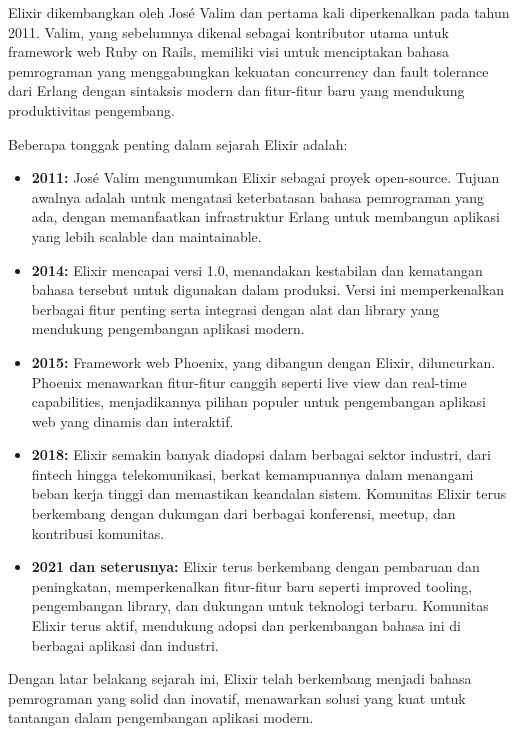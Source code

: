 Elixir dikembangkan oleh José Valim dan pertama kali diperkenalkan pada tahun 2011. Valim, yang sebelumnya dikenal sebagai kontributor utama untuk framework web Ruby on Rails, memiliki visi untuk menciptakan bahasa pemrograman yang menggabungkan kekuatan concurrency dan fault tolerance dari Erlang dengan sintaksis modern dan fitur-fitur baru yang mendukung produktivitas pengembang.

Beberapa tonggak penting dalam sejarah Elixir adalah:

\begin{itemize}
	\item \textbf{2011:} José Valim mengumumkan Elixir sebagai proyek open-source. Tujuan awalnya adalah untuk mengatasi keterbatasan bahasa pemrograman yang ada, dengan memanfaatkan infrastruktur Erlang untuk membangun aplikasi yang lebih scalable dan maintainable.
	
	\item \textbf{2014:} Elixir mencapai versi 1.0, menandakan kestabilan dan kematangan bahasa tersebut untuk digunakan dalam produksi. Versi ini memperkenalkan berbagai fitur penting serta integrasi dengan alat dan library yang mendukung pengembangan aplikasi modern.
	
	\item \textbf{2015:} Framework web Phoenix, yang dibangun dengan Elixir, diluncurkan. Phoenix menawarkan fitur-fitur canggih seperti live view dan real-time capabilities, menjadikannya pilihan populer untuk pengembangan aplikasi web yang dinamis dan interaktif.
	
	\item \textbf{2018:} Elixir semakin banyak diadopsi dalam berbagai sektor industri, dari fintech hingga telekomunikasi, berkat kemampuannya dalam menangani beban kerja tinggi dan memastikan keandalan sistem. Komunitas Elixir terus berkembang dengan dukungan dari berbagai konferensi, meetup, dan kontribusi komunitas.
	
	\item \textbf{2021 dan seterusnya:} Elixir terus berkembang dengan pembaruan dan peningkatan, memperkenalkan fitur-fitur baru seperti improved tooling, pengembangan library, dan dukungan untuk teknologi terbaru. Komunitas Elixir terus aktif, mendukung adopsi dan perkembangan bahasa ini di berbagai aplikasi dan industri.
\end{itemize}

Dengan latar belakang sejarah ini, Elixir telah berkembang menjadi bahasa pemrograman yang solid dan inovatif, menawarkan solusi yang kuat untuk tantangan dalam pengembangan aplikasi modern.



